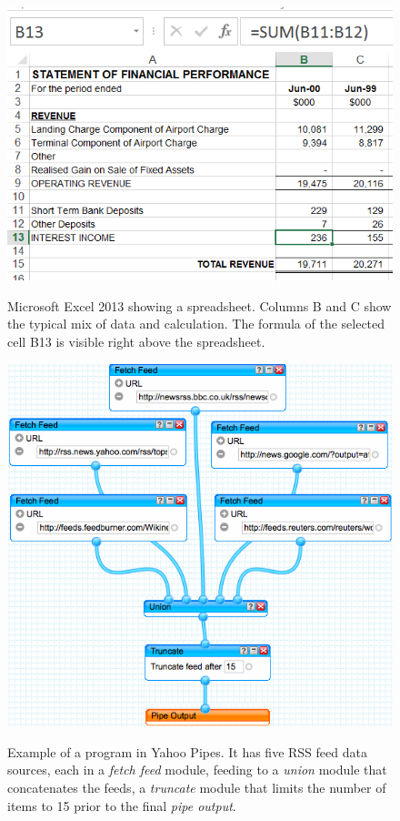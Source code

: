 \documentclass{sig-alternate}
\begin{document}
\begin{figure}
\caption{Microsoft Excel 2013 showing a spreadsheet. Columns B and C show the typical mix of data and calculation. The formula of the selected cell B13 is visible right above the spreadsheet.}
\centering
\includegraphics[width=\columnwidth]{img/excel-2}
\label{fig:spreadsheetexample}
\end{figure}

\begin{figure}
\caption{Example of a program in Yahoo Pipes. It has five RSS feed data sources, each in a \emph{fetch feed} module, feeding to a \emph{union} module that concatenates the feeds, a \emph{truncate} module that limits the number of items to 15 prior to the final \emph{pipe output}. }
\centering
\includegraphics[width=\columnwidth]{img/yp-1}
\label{fig:ypexample}
\end{figure}
\end{document}
